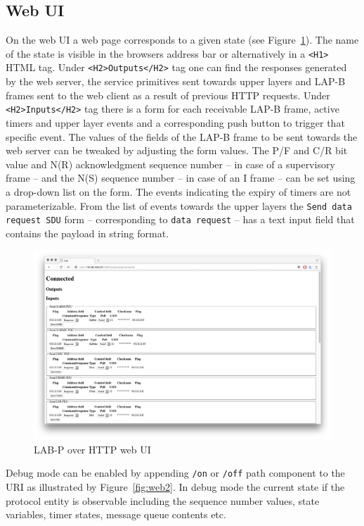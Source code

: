 \documentclass[a4paper]{article}
\begin{document}
\subsection{Web UI}

On the web UI a web page corresponds to a given state (see Figure~\ref{fig:web}). The name of the state is visible in the browsers address bar or alternatively in  a \verb!<H1>! HTML tag.
Under \verb!<H2>Outputs</H2>! tag one can find the responses generated by the web server, the service primitives sent towards upper layers and LAP-B frames sent to the web client as a result of previous HTTP requests.
Under \verb!<H2>Inputs</H2>! tag there is a form for each receivable LAP-B frame, active timers and upper layer events and a corresponding push button to trigger that specific event. The values of the fields of the LAP-B frame to be sent towards the web server can be tweaked by adjusting the form values. The P/F and C/R bit value and N(R) acknowledgment sequence number -- in case of a supervisory frame -- and the N(S) sequence number -- in case of an I frame --  can be set using a drop-down list on the form. The events indicating the expiry of timers are not parameterizable. From the list of events towards the upper layers the \verb!Send data request SDU! form -- corresponding to \verb!data request! -- has a text input field that contains the payload in string format.

\begin{figure}[!htb]
  \centering
  \includegraphics[width=\textwidth]{figures/web.png}
  \caption{LAB-P over HTTP web UI}
  \label{fig:web}
\end{figure}

Debug mode can be enabled by appending \verb!/on! or \verb!/off! path component to the URI as illustrated by Figure~\ref{fig:web2}. In debug mode the current state if the protocol entity is observable including the sequence number values, state variables, timer states, message queue contents etc. 
\end{document}
